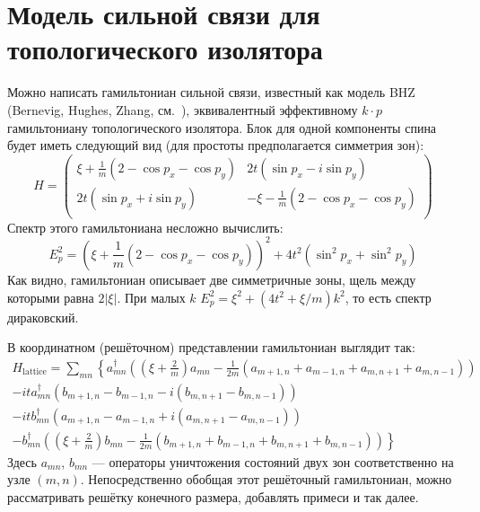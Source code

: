 \section{Модель сильной связи для \\топологического изолятора}
Можно написать гамильтониан сильной связи, известный как модель BHZ 
(Bernevig, Hughes, Zhang, см.~\cite{Bernevig2006}), 
эквивалентный эффективному $k\cdot p$ гамильтониану
топологического изолятора. Блок
для одной компоненты спина будет иметь следующий вид (для простоты предполагается симметрия
зон):
\begin{equation}
    \label{BHZ}
    H = \left(\begin{matrix}
            \xi + \frac{1}{m}(2 - \cos{p_x} - \cos{p_y}) & 2t(\sin{p_x} - i\sin{p_y})   \\
            2t(\sin{p_x} + i\sin{p_y}) & - \xi - \frac{1}{m}(2 - \cos{p_x} - \cos{p_y}) \\
        \end{matrix}\right)
\end{equation}
Спектр этого гамильтониана несложно вычислить:
\begin{equation}
    E_p^2 = (\xi + \frac{1}{m}(2 - \cos{p_x} - \cos{p_y}))^2 + 4t^2(\sin^2{p_x} + \sin^2{p_y})
\end{equation}
Как видно, гамильтониан описывает две симметричные зоны, щель между которыми равна $2|\xi|$. 
При малых $k$ $E_p^2 = \xi^2 + (4t^2 + \xi/m)k^2$, то есть спектр дираковский.

В координатном (решёточном) представлении гамильтониан выглядит так:
\begin{multline}
    \label{BHZ_tight_binding}
    H_{\mathrm{lattice}} = \sum_{mn} \left\{
        a_{mn}^\dagger\left( \left(\xi + \frac{2}{m}\right) a_{mn}
                 -\frac{1}{2m}(a_{m+1,n} + a_{m-1,n} + a_{m,n+1} + a_{m,n-1})\right)\right. \\
        -it a_{mn}^\dagger(b_{m+1,n} -b_{m-1,n} - i(b_{m,n+1} - b_{m,n-1}))\\
        -it b_{mn}^\dagger(a_{m+1,n} -a_{m-1,n} + i(a_{m,n+1} - a_{m,n-1}))\\
        -\left. b_{mn}^\dagger\left( \left(\xi + \frac{2}{m}\right) b_{mn}
                 -\frac{1}{2m}(b_{m+1,n} + b_{m-1,n} + b_{m,n+1} + b_{m,n-1})\right) \right\}
\end{multline}
Здесь $a_{mn}$, $b_{mn}$ --- операторы уничтожения состояний двух зон 
соответственно на узле $(m,n)$. Непосредственно обобщая этот решёточный гамильтониан, можно
рассматривать решётку конечного размера, добавлять примеси и так далее. 
